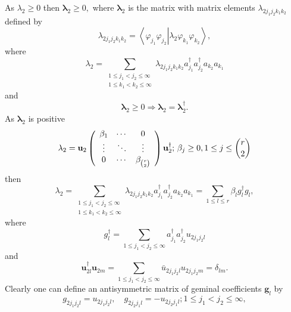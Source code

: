 \documentclass[aps,preprint]{revtex4}%
\begin{document}
As $\lambda_{2}\geq0$ then $\mathbf{\lambda}_{2}\geq0,$ where $\mathbf{\lambda
}_{2}$ is the matrix with matrix elements $\lambda_{2j_{1}j_{2}k_{1}k_{2}}$
defined by
\begin{equation}
\lambda_{2j_{1}j_{2}k_{1}k_{2}}=\left\langle \left.  \varphi_{j_{1}}%
\varphi_{j_{2}}\right\vert \lambda_{2}\varphi_{k_{1}}\varphi_{k_{2}%
}\right\rangle ,
\end{equation}
where
\begin{equation}
\lambda_{2}=\sum_{\substack{1\leq j_{1}<j_{2}\leq\infty\\1\leq k_{1}<k_{2}%
\leq\infty}}\lambda_{2j_{1}j_{2}k_{1}k_{2}}a_{j_{1}}^{\dagger}a_{j_{2}%
}^{\dagger}a_{k_{2}}a_{k_{1}}%
\end{equation}
and
\begin{equation}
\mathbf{\lambda}_{2}\geq0\Rightarrow\mathbf{\lambda}_{2}=\mathbf{\lambda}%
_{2}^{\dagger}.
\end{equation}
As $\mathbf{\lambda}_{2}$ is positive
\begin{equation}
\mathbf{\lambda}_{2}=\mathbf{u}_{2}\left(
\begin{array}
[c]{ccc}%
\beta_{1} & \cdots & 0\\
\vdots & \ddots & \vdots\\
0 & \cdots & \beta_{\binom{r}{2}}%
\end{array}
\right)  \mathbf{u}_{2}^{\dagger};\,\beta_{j}\geq0,1\leq j\leq\binom{r}{2}%
\end{equation}
then
\begin{equation}
\lambda_{2}=\sum_{\substack{1\leq j_{1}<j_{2}\leq\infty\\1\leq k_{1}<k_{2}%
\leq\infty}}\lambda_{2j_{1}j_{2}k_{1}k_{2}}a_{j_{1}}^{\dagger}a_{j_{2}%
}^{\dagger}a_{k_{2}}a_{k_{1}}=\sum_{1\leq l\leq r}\beta_{l}g_{l}^{\dagger
}g_{l}, \label{ProjEx}%
\end{equation}
where%
\begin{equation}
g_{l}^{\dagger}=\sum_{1\leq j_{1}<j_{2}\leq\infty}a_{j_{1}}^{\dagger}a_{j_{2}%
}^{\dagger}u_{2j_{1}j_{2}l}%
\end{equation}
and
\begin{equation}
\mathbf{u}_{2l}^{\dagger}\mathbf{u}_{2m}=\sum_{1\leq j_{1}<j_{2}\leq\infty
}\bar{u}_{2j_{1}j_{2}l}u_{2j_{1}j_{2}m}=\delta_{lm}.
\end{equation}
Clearly one can define an antisymmetric matrix of geminal coefficients
$\mathbf{g}_{l}$ by
\begin{equation}
g_{2j_{1}j_{2}l}=u_{2j_{1}j_{2}l},\quad g_{2j_{2}j_{1}l}=-u_{2j_{2}j_{1}%
l};1\leq j_{1}<j_{2}\leq\infty,
\end{equation}
\end{document}
